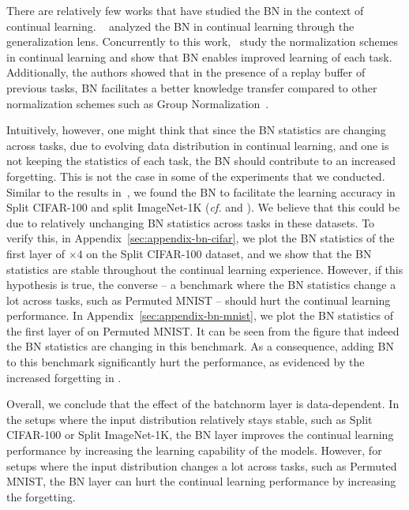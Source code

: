 There are relatively few works that have studied the BN in the context of continual learning. ~\citet{mirzadeh_understanding_continual} analyzed the BN in continual learning through the generalization lens. Concurrently to this work,~\citet{ContinualNormalization} study the normalization schemes in continual learning and show that BN enables improved learning of each task. Additionally, the authors showed that in the presence of a replay buffer of previous tasks, BN facilitates a better knowledge transfer compared to other normalization schemes such as Group Normalization~\citep{GroupNorm}.

Intuitively, however, one might think that since the BN statistics are changing across tasks, due to evolving data distribution in continual learning, and one is not keeping the statistics of each task, the BN should contribute to an increased forgetting. This is not the case in some of the experiments that we conducted. Similar to the results in~\citet{mirzadeh_understanding_continual,ContinualNormalization}, we found the BN to facilitate the learning accuracy in Split CIFAR-100 and split ImageNet-1K (\emph{cf.}  and ). We believe that this could be due to relatively unchanging BN statistics across tasks in these datasets. To verify this, in Appendix~\ref{sec:appendix-bn-cifar}, we plot the BN statistics of the first layer of \CNN$\times{4}$ on the Split CIFAR-100 dataset, and we show that the BN statistics are stable throughout the continual learning experience. However, if this hypothesis is true, the converse -- a benchmark where the BN statistics change a lot across tasks, such as Permuted MNIST -- should hurt the continual learning performance. In Appendix~\ref{sec:appendix-bn-mnist}, we plot the BN statistics of the first layer of  on Permuted MNIST. It can be seen from the figure that indeed the BN statistics are changing in this benchmark. As a consequence, adding BN to this benchmark significantly hurt the performance, as evidenced by the increased forgetting in .

Overall, we conclude that the effect of the batchnorm layer is data-dependent. In the setups where the input distribution relatively stays stable, such as Split CIFAR-100 or Split ImageNet-1K, the BN layer improves the continual learning performance by increasing the learning capability of the models. However, for setups where the input distribution changes a lot across tasks, such as Permuted MNIST, the BN layer can hurt the continual learning performance by increasing the forgetting.



